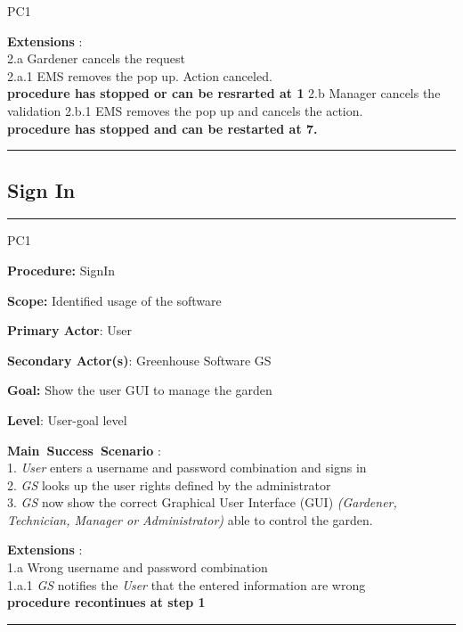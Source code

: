 \begin{lyxlist}{PC1}
{\item [\textbf{Extensions}]:\\
2.a Gardener cancels the request\\
\hspace*{0.5cm} 2.a.1 {EMS} removes the pop up. Action canceled.\\
\hspace*{0.5cm} \textbf{procedure has stopped or can be resrarted at 1}
2.b Manager cancels the validation
\hspace*{0.5cm}2.b.1 {EMS} removes the pop up and cancels the action.\\
\hspace*{0.5cm}\textbf{procedure has stopped and can be restarted at 7.}
}
\end{lyxlist}
\hrule
\vspace{0.5cm}


\break
 
 
 
 

\subsection{Sign In}
\vspace{0.5cm}
\hrule
\hfill \break
\begin{lyxlist}{PC1}
\small{
\item [\textbf{Procedure:}] SignIn
\item [\textbf{Scope:}] Identified usage of the software
\item [\textbf{Primary Actor}:] User
\item [\textbf{Secondary Actor(s)}:] Greenhouse Software GS
\item [\textbf{Goal:}] Show the user GUI to manage the garden
\item [\textbf{Level}:] User-goal level
\item [\textbf{Main~Success~Scenario}]:\\
1. \emph{User} enters a username and password combination and signs in\\
2. \emph{GS} looks up the user rights defined by the administrator\\
3. \emph{GS} now show the correct Graphical User Interface (GUI) \emph{(Gardener, Technician, Manager or Administrator)} able to control the garden.
\item [\textbf{Extensions}]:\\
1.a Wrong username and password combination\\
\hspace*{0.5cm} 1.a.1 \emph{GS} notifies the \emph{User} that the entered information are wrong\\
\hspace*{0.5cm} \textbf{procedure recontinues at step 1}
}
\end{lyxlist}
\hrule
\vspace{0.5cm}


